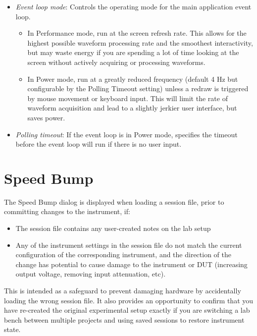 \begin{itemize}
\item \emph{Event loop mode}: Controls the operating mode for the main application event loop.
\begin{itemize}
\item In Performance mode, run at the screen refresh rate. This allows for the highest possible waveform processing rate
and the smoothest interactivity, but may waste energy if you are spending a lot of time looking at the screen without
actively acquiring or processing waveforms.
\item In Power mode, run at a greatly reduced frequency (default 4 Hz but configurable by the Polling Timeout setting)
unless a redraw is triggered by mouse movement or keyboard input. This will limit the rate of waveform acquisition and
lead to a slightly jerkier user interface, but saves power.
\end{itemize}
\item \emph{Polling timeout}: If the event loop is in Power mode, specifies the timeout before the event loop will run
if there is no user input.
\end{itemize}


\section{Speed Bump}
\label{dlg:speedbump}

The Speed Bump dialog is displayed when loading a session file, prior to committing changes to the instrument, if:

\begin{itemize}
\item The session file contains any user-created notes on the lab setup
\item Any of the instrument settings in the session file do not match the current configuration of the corresponding
instrument, and the direction of the change has potential to cause damage to the instrument or DUT (increasing output
voltage, removing input attenuation, etc).
\end{itemize}

This is intended as a safeguard to prevent damaging hardware by accidentally loading the wrong session file. It also
provides an opportunity to confirm that you have re-created the original experimental setup exactly if you are
switching a lab bench between multiple projects and using saved sessions to restore instrument state.

